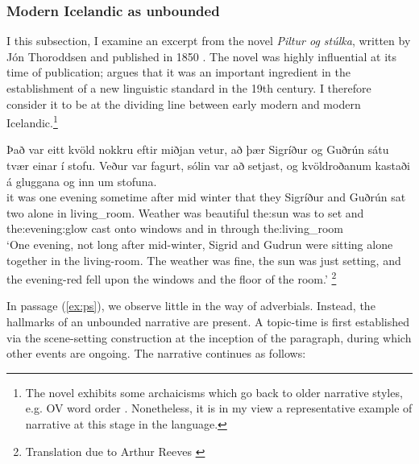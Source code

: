 \documentclass[output=paper,colorlinks,citecolor=brown]{langscibook}
\begin{document}
\subsubsection{Modern Icelandic as unbounded}\label{sec:Chark4.2.3}

I this subsection, I examine an excerpt from the novel \textit{Piltur og stúlka}, written by Jón Thoroddsen and published in 1850 \citep{Thoroddsen_PilturOgStulka}. The novel was highly influential at its time of publication; \citet{bernhardhsson2018spreading} argues that it was an important ingredient in the establishment of a new linguistic standard in the 19th century. I therefore consider it to be at the dividing line between early modern and modern Icelandic.\footnote{The novel exhibits some archaicisms which go back to older narrative styles, e.g. OV word order \citep{bernhardhsson2018spreading}. Nonetheless, it is in my view a representative example of narrative at this stage in the language.}


\ea\label{ex:ps}
\gll Það var eitt kvöld nokkru eftir miðjan vetur, að þær Sigríður og Guðrún sátu tvær einar í stofu. Veður var fagurt, sólin var að setjast, og kvöldroðanum kastaði á gluggana og inn um stofuna.\\ it was one evening sometime after mid winter that they Sigríður and Guðrún sat two alone in living\_room. Weather was beautiful the:sun was to set and the:evening:glow cast onto windows and in through the:living\_room\\
\glt `One evening, not long after mid-winter, Sigrid and Gudrun were sitting alone together in the living-room. The weather was fine, the sun was just setting, and the evening-red fell upon the windows and the floor of the room.' \hfill \citep{Thoroddsen_PilturOgStulka}\footnote{Translation due to Arthur Reeves \citep[164]{thoroddsen1890lad}}
\z

In passage (\ref{ex:ps}), we observe little in the way of   adverbials. Instead, the hallmarks of an unbounded narrative are present. A topic-time is first established via the scene-setting construction at the inception of the paragraph, during which other events are ongoing. The narrative continues as follows:
\end{document}
